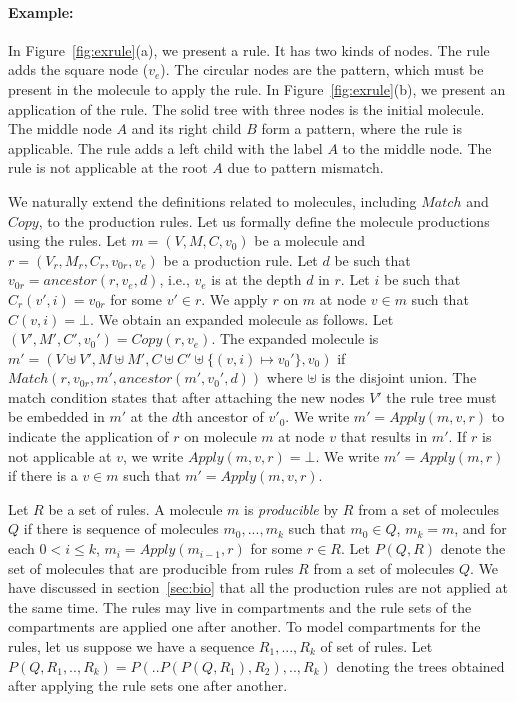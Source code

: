 \paragraph{Example:} In Figure~\ref{fig:exrule}(a), we present a rule. It has
  two kinds of nodes.
  The rule adds the square node ($v_e$).
  The circular nodes %
  are the pattern, which must be present in the molecule to apply the rule.
  In Figure~\ref{fig:exrule}(b), we present an application of the rule.
  The solid tree with three nodes is the initial molecule.
  The middle node $A$ and its right child $B$ form a pattern, where the rule is applicable.
  The rule adds a left child with the label $A$ to the middle node.
  The rule is not applicable at the root $A$ due to pattern mismatch.


We naturally extend the definitions related to molecules, including $Match$ and $Copy$,
to the production rules.
Let us formally define the molecule productions using the rules.
Let $m = (V,M,C,v_0)$ be a molecule and $r = (V_r, M_r, C_r, v_{0r}, v_e)$ be a production rule.
Let $d$ be such that $v_{0r} = ancestor(r,v_e,d)$, i.e., $v_e$ is at the depth $d$ in $r$.
Let $i$ be such that $C_r(v',i) = v_{0r}$ for some $v' \in r$.
We apply $r$ on $m$ at node $v \in m$ such that $C(v,i) = \bot$.
We obtain an expanded molecule as follows.
Let $(V',M',C',v_0') = Copy(r,v_e)$.
The expanded molecule is
$
m' = (V \uplus V', M \uplus M', C \uplus C' \uplus \{(v,i) \mapsto v_0'\}, v_0)
$ if
$Match( r, v_{0r}, m', ancestor(m', v_0', d) )$ where $\uplus$ is the disjoint union.
The match condition states that after attaching the new nodes $V'$
the rule tree must be embedded in $m'$ at the $d$th ancestor of $v'_0$. 
We write $m' = Apply(m, v, r)$ to indicate the application of $r$
on molecule $m$ at node $v$ that results in $m'$.
If $r$ is not applicable at $v$, we write $Apply(m, v, r) = \bot$.
We write $m' = Apply(m, r)$ if there is a $v \in m$ such that
$m' = Apply(m,v,r)$.

Let $R$ be a set of rules.
A molecule $m$ is {\em producible} by $R$ from a set of molecules $Q$
if there is sequence of molecules $m_0,...,m_k$
such that $m_0 \in Q$, $m_k=m$, and
for each $0<i\leq k$, $m_{i} = Apply(m_{i-1},r)$ for some $r \in R$.
Let $P(Q,R)$ denote the set of molecules that are producible from
rules $R$ from a set of molecules $Q$.
We have discussed in section~\ref{sec:bio} that all the production rules
are not applied at the same time.
The rules may live in compartments and
the rule sets of the compartments are applied one after another.
To model compartments for the rules,
let us suppose we have a sequence $R_1,...,R_k$ of set of rules.
Let $P(Q, R_1,..,R_k) = P(..P(P(Q,R_1),R_2),..,R_k)$ denoting the
trees obtained after applying the rule sets one after another.

